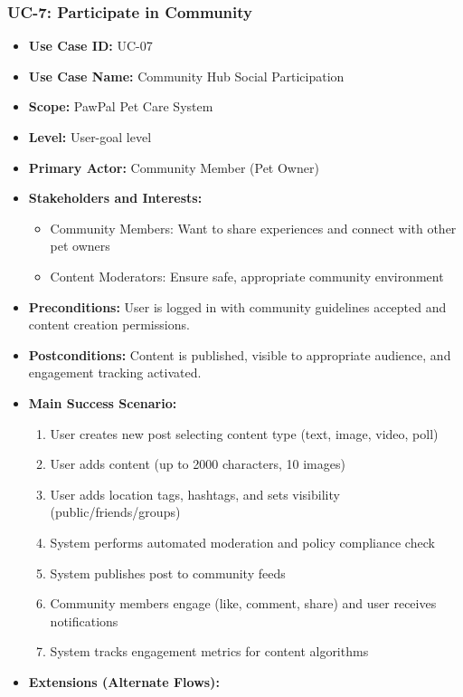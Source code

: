 \subsubsection*{UC-7: Participate in Community}
\begin{itemize}
    \item \textbf{Use Case ID:} UC-07
    \item \textbf{Use Case Name:} Community Hub Social Participation
    \item \textbf{Scope:} PawPal Pet Care System
    \item \textbf{Level:} User-goal level
    \item \textbf{Primary Actor:} Community Member (Pet Owner)
    \item \textbf{Stakeholders and Interests:}
    \begin{itemize}
        \item Community Members: Want to share experiences and connect with other pet owners
        \item Content Moderators: Ensure safe, appropriate community environment
    \end{itemize}
    \item \textbf{Preconditions:} User is logged in with community guidelines accepted and content creation permissions.
    \item \textbf{Postconditions:} Content is published, visible to appropriate audience, and engagement tracking activated.
    \item \textbf{Main Success Scenario:}
    \begin{enumerate}
        \item User creates new post selecting content type (text, image, video, poll)
        \item User adds content (up to 2000 characters, 10 images)
        \item User adds location tags, hashtags, and sets visibility (public/friends/groups)
        \item System performs automated moderation and policy compliance check
        \item System publishes post to community feeds
        \item Community members engage (like, comment, share) and user receives notifications
        \item System tracks engagement metrics for content algorithms
    \end{enumerate}
    \item \textbf{Extensions (Alternate Flows):}

\end{itemize}
